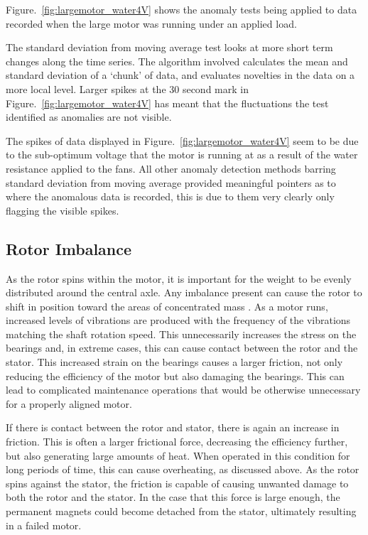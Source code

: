 Figure.~\ref{fig:largemotor_water4V} shows the anomaly tests being applied to data recorded when the large motor was running under an applied load.

The standard deviation from moving average test looks at more short term changes along the time series. The algorithm involved calculates the mean and standard deviation of a `chunk' of data, and evaluates novelties in the data on a more local level. Larger spikes at the 30 second mark in Figure.~\ref{fig:largemotor_water4V} has meant that the fluctuations the test identified as anomalies are not visible.

The spikes of data displayed in Figure.~\ref{fig:largemotor_water4V} seem to be due to the sub-optimum voltage that the motor is running at as a result of the water resistance applied to the fans. All other anomaly detection methods barring standard deviation from moving average provided meaningful pointers as to where the anomalous data is recorded, this is due to them very clearly only flagging the visible spikes.




\subsection{Rotor Imbalance}
As the rotor spins within the motor, it is important for the weight to be evenly distributed around the central axle. Any imbalance present can cause the rotor to shift in position toward the areas of concentrated mass \cite{xu1994vibration}. As a motor runs, increased levels of vibrations are produced with the frequency of the vibrations matching the shaft rotation speed. This unnecessarily increases the stress on the bearings and, in extreme cases, this can cause contact between the rotor and the stator. This increased strain on the bearings causes a larger friction, not only reducing the efficiency of the motor but also damaging the bearings. This can lead to complicated maintenance operations that would be otherwise unnecessary for a properly aligned motor.

If there is contact between the rotor and stator, there is again an increase in friction. This is often a larger frictional force, decreasing the efficiency further, but also generating large amounts of heat. When operated in this condition for long periods of time, this can cause overheating, as discussed above. As the rotor spins against the stator, the friction is capable of causing unwanted damage to both the rotor and the stator. In the case that this force is large enough, the permanent magnets could become detached from the stator, ultimately resulting in a failed motor.

